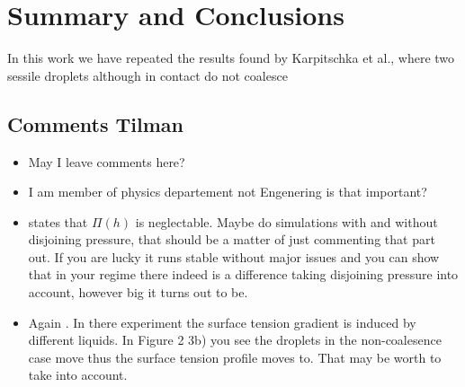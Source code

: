 \documentclass[twocolumn,amsmath,amssymb,showpacs,pre,nofootinbib,superscriptaddress]{revtex4-1} %
\begin{document}
\section{Summary and Conclusions}\label{sec:sum_conclu}
In this work we have repeated the results found by Karpitschka et al., where two sessile droplets although in contact do not coalesce~\cite{karpitschka2014sharp, doi:10.1021/la500459v}

\begin{acknowledgements}

\end{acknowledgements}
\subsection{Comments Tilman}

\begin{itemize}
    \item May I leave comments here?
    \item I am member of physics departement not Engenering is that important?
    \item \cite{doi:10.1021/la500459v} states that $\Pi(h)$ is neglectable. Maybe do simulations with and without disjoining pressure, that should be a matter of just commenting that part out. If you are lucky it runs stable without major issues and you can show that in your regime there indeed is a difference taking disjoining pressure into account, however big it turns out to be. 
    \item Again \cite{doi:10.1021/la500459v}. In there experiment the surface tension gradient is induced by different liquids. In Figure 2 3b) you see the droplets in the non-coalesence case move thus the surface tension profile moves to. That may be worth to take into account.
\end{itemize}

%



\end{document}
